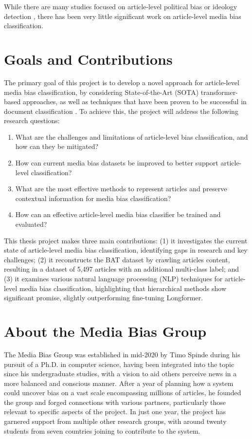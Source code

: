 While there are many studies focused on article-level political bias or ideology detection \cite{kulkarni-2018-multi-view,baly-2020-we-can-detect-your-bias,baly-2019-mt}, there has been very little significant work on article-level media bias classification.

\section{Goals and Contributions}

The primary goal of this project is to develop a novel approach for article-level media bias classification, by considering State-of-the-Art (SOTA) transformer-based approaches, as well as techniques that have been proven to be successful in document classification \cite{su-2021-classifying,wan-2019-long-length,park-2022-efficient,pappagari-2019-hierarchical}. To achieve this, the project will address the following research questions:
\begin{enumerate}
    \item What are the challenges and limitations of article-level bias classification, and how can they be mitigated?
    \item How can current media bias datasets be improved to better support article-level classification?
    \item What are the most effective methods to represent articles and preserve contextual information for media bias classification?
    \item How can an effective article-level media bias classifier be trained and evaluated?
\end{enumerate}

This thesis project makes three main contributions: (1) it investigates the current state of article-level media bias classification, identifying gaps in research and key challenges; (2) it reconstructs the BAT dataset by crawling articles content, resulting in a dataset of 5,497 articles with an additional multi-class label; and (3) it examines various natural language processing (NLP) techniques for article-level media bias classification, highlighting that hierarchical methods show significant promise, slightly outperforming fine-tuning Longformer.

\section{About the Media Bias Group}

The Media Bias Group \cite{media-bias-group} was established in mid-2020 by Timo Spinde during his pursuit of a Ph.D. in computer science, having been integrated into the topic since his undergraduate studies, with a vision to aid others perceive news in a more balanced and conscious manner. After a year of planning how a system could uncover bias on a vast scale encompassing millions of articles, he founded the group and forged connections with various partners, particularly those relevant to specific aspects of the project. In just one year, the project has garnered support from multiple other research groups, with around twenty students from seven countries joining to contribute to the system.

